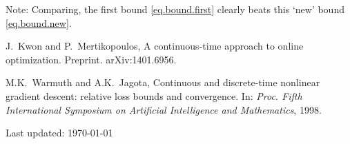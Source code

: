 \documentclass[12pt]{article}
\theoremstyle{plain}
\theoremstyle{definition}
\theoremstyle{remark}
\begin{document}
\medskip

\noindent
Note: Comparing, the first bound \eqref{eq.bound.first} clearly beats this
`new' bound \eqref{eq.bound.new}.



\medskip

\begin{thebibliography}{biblio}

  J.~Kwon and P.~Mertikopoulos,
  A continuous-time approach to online optimization.
  Preprint. arXiv:1401.6956.

  M.K.~Warmuth and A.K.~Jagota,
  Continuous and discrete-time nonlinear gradient descent: relative loss bounds and convergence.
  In: 
  \textit{Proc. Fifth International Symposium on Artificial Intelligence and Mathematics}, 1998.


\end{thebibliography}


\vspace{.5cm}


\noindent
Last updated: \today
\end{document}
